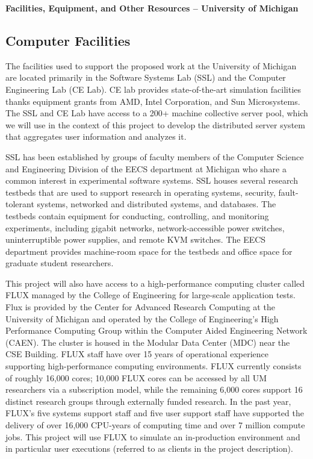 \documentclass{article}
\begin{document}
\begin{center}
\textbf{\Large Facilities, Equipment, and Other Resources -- University of Michigan}
\end{center}

\vspace{1em}

\subsection*{Computer Facilities}

The facilities used to support the proposed work at the University of Michigan are located primarily in the Software Systems Lab (SSL) and the Computer Engineering Lab (CE Lab). CE lab provides state-of-the-art simulation facilities thanks equipment grants from AMD, Intel Corporation, and Sun Microsystems. The SSL and CE Lab have access to a 200+ machine collective server pool, which we will use in the context of this project to develop the distributed server system that aggregates user information and analyzes it.
 
SSL has been established by groups of faculty members of the Computer Science and Engineering Division of the EECS department at Michigan who share a common interest in experimental software systems. SSL houses several research testbeds that are used to support research in operating systems, security, fault-tolerant systems, networked and distributed systems, and databases. The testbeds contain equipment for conducting, controlling, and monitoring experiments, including gigabit networks, network-accessible power switches, uninterruptible power supplies, and remote KVM switches. The EECS department provides machine-room space for the testbeds and office space for graduate student researchers.

This project will also have access to a high-performance computing cluster called FLUX managed by the College of Engineering for large-scale application tests.  Flux is provided by the Center for Advanced Research Computing at the University of Michigan and operated by the College of Engineering's High Performance Computing Group within the Computer Aided Engineering Network (CAEN). The cluster is housed in the Modular Data Center (MDC) near the CSE Building.  FLUX staff have over 15 years of operational experience supporting high-performance computing environments. FLUX currently consists of roughly 16,000 cores; 10,000 FLUX cores can be accessed by all UM researchers via a subscription model, while the remaining 6,000 cores support 16 distinct research groups through externally funded research. In the past year, FLUX's five systems support staff and five user support staff have supported the delivery of over 16,000 CPU-years of computing time and over 7 million compute jobs. This project will use FLUX to simulate an in-production environment and in particular user executions (referred to as clients in the project description).
\end{document}
